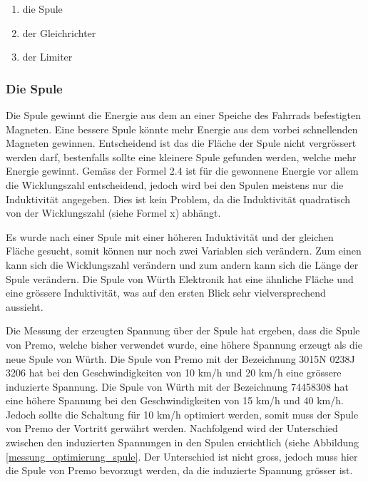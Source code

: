\begin{enumerate}
    \item die Spule
    \item der Gleichrichter
    \item der Limiter
\end{enumerate}

\subsubsection{Die Spule}

Die Spule gewinnt die Energie aus dem an einer Speiche des Fahrrads befestigten Magneten. Eine bessere Spule könnte mehr Energie aus dem vorbei schnellenden Magneten gewinnen. Entscheidend ist das die Fläche der Spule nicht vergrössert werden darf, bestenfalls sollte eine kleinere Spule gefunden werden, welche mehr Energie gewinnt. Gemäss der Formel 2.4 ist für die gewonnene Energie vor allem die Wicklungszahl entscheidend, jedoch wird bei den Spulen meistens nur die Induktivität angegeben. Dies ist kein Problem, da die Induktivität quadratisch von der Wicklungszahl (siehe Formel x) abhängt.


Es wurde nach einer Spule mit einer höheren Induktivität und der gleichen Fläche gesucht, somit können nur noch zwei Variablen sich verändern. Zum einen kann sich die Wicklungszahl verändern und zum andern kann sich die Länge der Spule verändern. Die Spule von Würth Elektronik hat eine ähnliche Fläche und eine grössere Induktivität, was auf den ersten Blick sehr vielversprechend aussieht.

Die Messung der erzeugten Spannung über der Spule hat ergeben, dass die Spule von Premo, welche bisher verwendet wurde, eine höhere Spannung erzeugt als die neue Spule von Würth. Die Spule von Premo mit der Bezeichnung 3015N 0238J 3206 hat bei den Geschwindigkeiten von 10 km/h und 20 km/h eine grössere induzierte Spannung. Die Spule von Würth mit der Bezeichnung 74458308 hat eine höhere Spannung bei den Geschwindigkeiten von 15 km/h und 40 km/h. Jedoch sollte die Schaltung für 10 km/h optimiert werden, somit muss der Spule von Premo der Vortritt gerwährt werden. Nachfolgend wird der Unterschied zwischen den induzierten Spannungen in den Spulen ersichtlich (siehe Abbildung \ref{messung_optimierung_spule}. Der Unterschied ist nicht gross, jedoch muss hier die Spule von Premo bevorzugt werden, da die induzierte Spannung grösser ist.

